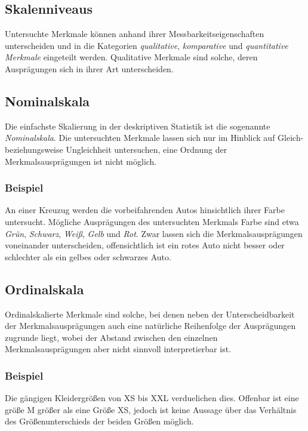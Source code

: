 \documentclass[a4paper]{scrartcl}
\begin{document}
\begin{multicols}{2}
            \subsection{Skalenniveaus}
                Untersuchte Merkmale können anhand ihrer Messbarkeitseigenschaften unterscheiden und in die Kategorien \emph{qualitative}, \emph{komparative} und \emph{quantitative Merkmale} eingeteilt werden.
                Qualitative Merkmale sind solche, deren Ausprägungen sich in ihrer Art unterscheiden. 
                \cite{kohn2005}
            \subsection{Nominalskala}
                Die einfachste Skalierung in der deskriptiven Statistik ist die sogenannte \emph{Nominalskala}. Die untersuchten Merkmale lassen sich nur im Hinblick auf Gleich- beziehungsweise Ungleichheit untersuchen, eine Ordnung der Merkmalsausprägungen ist nicht möglich. 
                \cite{kohn2005}
                \subsubsection{Beispiel}
                    An einer Kreuzug werden die vorbeifahrenden Autos hinsichtlich ihrer Farbe untersucht. Mögliche Ausprägungen des untersuchten Merkmals Farbe sind etwa \emph{Grün}, \emph{Schwarz}, \emph{Weiß}, \emph{Gelb} und \emph{Rot}. Zwar lassen sich die Merkmalsausprägungen voneinander unterscheiden, offensichtlich ist ein rotes Auto nicht besser oder schlechter als ein gelbes oder schwarzes Auto.
                \subsection{Ordinalskala}
                    Ordinalskalierte Merkmale sind solche, bei denen neben der Unterscheidbarkeit der Merkmalsausprägungen auch eine natürliche Reihenfolge der Ausprägungen zugrunde liegt, wobei der Abstand zwischen den einzelnen Merkmalsausprägungen aber nicht sinnvoll interpretierbar ist. \cite{kohn2005}
                    \subsubsection{Beispiel}
                        Die gängigen Kleidergrößen von XS bis XXL verduelichen dies. Offenbar ist eine größe M größer als eine Größe XS, jedoch ist keine Aussage über das Verhältnis des Größenunterschieds der beiden Größen möglich.

\end{multicols}
\end{document}
